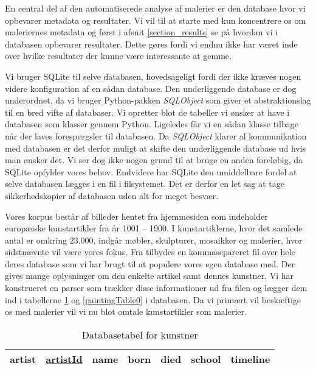 {
En central del af den automatiserede analyse af malerier er den database
hvor vi opbevarer metadata og resultater. Vi vil til at starte med kun
koncentrere os om maleriernes metadata og først i afsnit
\ref{section_results} se på hvordan vi i databasen opbevarer resultater.
Dette gøres fordi vi endnu ikke har været inde over hvilke resultater
der kunne være interessante at gemme.

Vi bruger SQLite til selve databasen, hovedsageligt fordi der ikke kræves
nogen videre konfiguration af en sådan database. Den underliggende
database er dog underordnet, da vi bruger Python-pakken \emph{SQLObject}
som giver et abstraktionslag til en bred vifte af databaser. Vi opretter
blot de tabeller vi ønsker at have i databasen som klasser gennem
Python. Ligeledes får vi en sådan klasse tilbage når der laves
forespørgsler til databasen. Da \emph{SQLObject} klarer al kommunikation
med databasen er det derfor muligt at skifte den underliggende database
ud hvis man ønsker det. Vi ser dog ikke nogen grund til at bruge en
anden foreløbig, da SQLite opfylder vores behov. Endvidere har SQLite
den umiddelbare fordel at selve databasen lægges i en fil i filsystemet.
Det er derfor en let sag at tage sikkerhedskopier af databasen uden alt
for meget besvær.

Vores korpus består af billeder hentet fra hjemmesiden \cite{wgahu} som
indeholder europæiske kunstartikler fra år 1001 -- 1900. I
kunstartiklerne, hvor det samlede antal er omkring 23.000, indgår
møbler, skulpturer, mosaikker og malerier, hvor sidstnævnte vil være
vores fokus. Fra \cite{wgahu} tilbydes en kommasepareret fil over hele
deres database som vi har brugt til at populere vores egen database med.
Der gives mange oplysninger om den enkelte artikel samt dennes kunstner.
Vi har konstrueret en parser som trækker disse informationer ud fra
filen og lægger dem ind i tabellerne \ref{artistTable0} og
\ref{paintingTable0} i databasen. Da vi primært vil beskæftige os med
malerier vil vi nu blot omtale kunstartikler som malerier.

\begin{table}[!h]
    \centering
    \begin{tabular}{|l||c|c|c|c|c|c|}
        \hline
        \bf{artist} \hspace{0.5cm} & \underline{artistId} & name & born & died & school & timeline \\\hline
    \end{tabular}
    \caption{Databasetabel for kunstner}
    \label{artistTable0}
\end{table}

}
